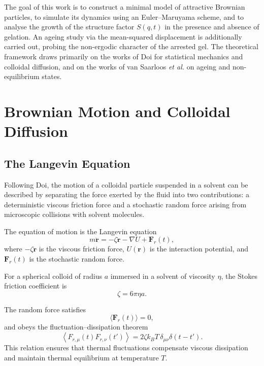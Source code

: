\documentclass[11pt,a4paper]{article}
\begin{document}
The goal of this work is to construct a minimal model of attractive Brownian particles, to simulate its dynamics using an Euler--Maruyama scheme, and to analyse the growth of the structure factor $S(q,t)$ in the presence and absence of gelation. An ageing study via the mean-squared displacement is additionally carried out, probing the non-ergodic character of the arrested gel. The theoretical framework draws primarily on the works of Doi for statistical mechanics and colloidal diffusion, and on the works of van Saarloos \textit{et al.} on ageing and non-equilibrium states.

\section{Brownian Motion and Colloidal Diffusion}

\subsection{The Langevin Equation}

Following Doi, the motion of a colloidal particle suspended in a solvent can be described by separating the force exerted by the fluid into two contributions: a deterministic viscous friction force and a stochastic random force arising from microscopic collisions with solvent molecules.

The equation of motion is the Langevin equation
\begin{equation}
    m\ddot{\mathbf r}
    =
    -\zeta \dot{\mathbf r}
    - \nabla U
    + \mathbf F_r(t),
    \label{eq:langevin}
\end{equation}
where $-\zeta \dot{\mathbf r}$ is the viscous friction force, $U(\mathbf r)$ is the interaction potential, and $\mathbf F_r(t)$ is the stochastic random force.

For a spherical colloid of radius $a$ immersed in a solvent of viscosity $\eta$, the Stokes friction coefficient is
\begin{equation}
    \zeta = 6\pi \eta a.
\end{equation}

The random force satisfies
\begin{equation}
    \langle \mathbf F_r(t)\rangle = 0,
\end{equation}
and obeys the fluctuation--dissipation theorem
\begin{equation}
    \left\langle
    F_{r,\mu}(t)F_{r,\nu}(t')
    \right\rangle
    =
    2\zeta k_B T\,\delta_{\mu\nu}\delta(t-t').
\end{equation}
This relation ensures that thermal fluctuations compensate viscous dissipation and maintain thermal equilibrium at temperature $T$.
\end{document}
